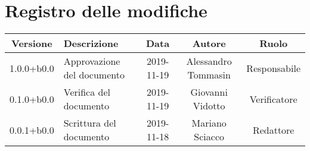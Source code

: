 \section*{Registro delle modifiche}

\begin{center}
	\begin{longtable}{|c|p{3cm}|c|c|c|}
	\hline
	\rowcolor{lighter-grayer}
	\textbf{Versione} & \textbf{Descrizione} & \textbf{Data} & \textbf{Autore} & \textbf{Ruolo} \\
	\hline
	\endfirsthead


	1.0.0+b0.0 & Approvazione del documento & 2019-11-19 & Alessandro Tommasin & Responsabile \\
	\hline
	0.1.0+b0.0 & Verifica del documento & 2019-11-19 & Giovanni Vidotto & Verificatore \\
	\hline
	0.0.1+b0.0 & Scrittura del documento & 2019-11-18 & Mariano Sciacco & Redattore \\
	\hline

	\end{longtable}
\end{center}